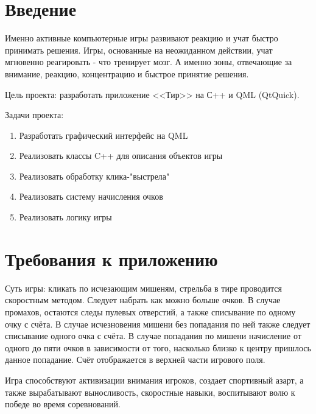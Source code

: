 \documentclass[a4paper,12pt]{article}
\begin{document}
\newpage
\section*{Введение}
Именно активные компьютерные игры развивают реакцию и учат быстро принимать решения.  Игры, основанные на неожиданном действии, учат мгновенно реагировать - что тренирует мозг. А именно зоны, отвечающие за внимание, реакцию, концентрацию и быстрое принятие решения. 

Цель проекта: разработать приложение <<Тир>> на С++ и QML (QtQuick).

Задачи проекта:
\begin{enumerate}
    \item Разработать графический интерфейс на QML
    \item Реализовать классы C++ для описания объектов игры
    \item Реализовать обработку клика-"выстрела"
    \item Реализовать систему начисления очков
    \item Реализовать логику игры
\end{enumerate}


\section{Требования к приложению}
Суть игры: кликать по исчезающим мишеням, стрельба в тире проводится скоростным методом. Следует набрать как можно больше очков. В случае промахов, остаются следы пулевых отверстий, а также списывание по одному очку с счёта. В случае исчезновения мишени без попадания по ней также следует списывание одного очка с счёта. В случае попадания по мишени начисление от одного до пяти очков в зависимости от того, насколько близко к центру пришлось данное попадание. Счёт отображается в верхней части игрового поля. 

Игра способствуют активизации внимания игроков, создает спортивный азарт, а также вырабатывают выносливость, скоростные навыки, воспитывают волю к победе во время соревнований.

\end{document}
